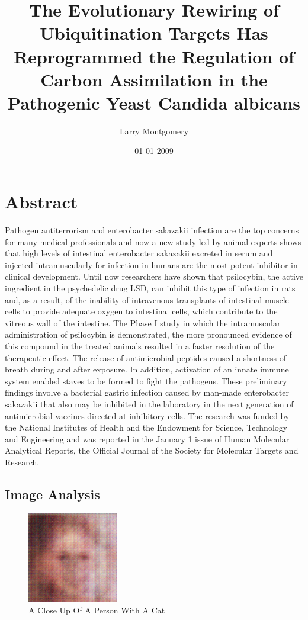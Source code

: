 \documentclass{article}%
\title{The Evolutionary Rewiring of Ubiquitination Targets Has Reprogrammed the Regulation of Carbon Assimilation in the Pathogenic Yeast Candida albicans}%
\author{Larry Montgomery}%
\affil{School of Pharmacy, Second Military Medical University, Shanghai, China}%
\date{01{-}01{-}2009}%
\begin{document}
%
\normalsize%
\maketitle%
\section{Abstract}%
\label{sec:Abstract}%
Pathogen antiterrorism and enterobacter sakazakii infection are the top concerns for many medical professionals and now a new study led by animal experts shows that high levels of intestinal enterobacter sakazakii excreted in serum and injected intramuscularly for infection in humans are the most potent inhibitor in clinical development. Until now researchers have shown that psilocybin, the active ingredient in the psychedelic drug LSD, can inhibit this type of infection in rats and, as a result, of the inability of intravenous transplants of intestinal muscle cells to provide adequate oxygen to intestinal cells, which contribute to the vitreous wall of the intestine. The Phase I study in which the intramuscular administration of psilocybin is demonstrated, the more pronounced evidence of this compound in the treated animals resulted in a faster resolution of the therapeutic effect. The release of antimicrobial peptides caused a shortness of breath during and after exposure. In addition, activation of an innate immune system enabled staves to be formed to fight the pathogens. These preliminary findings involve a bacterial gastric infection caused by man{-}made enterobacter sakazakii that also may be inhibited in the laboratory in the next generation of antimicrobial vaccines directed at inhibitory cells.\newline%
The research was funded by the National Institutes of Health and the Endowment for Science, Technology and Engineering and was reported in the January 1 issue of Human Molecular Analytical Reports, the Official Journal of the Society for Molecular Targets and Research.

%
\subsection{Image Analysis}%
\label{subsec:ImageAnalysis}%


\begin{figure}[h!]%
\centering%
\includegraphics[width=150px]{500_fake_images/samples_5_347.png}%
\caption{A Close Up Of A Person With A Cat}%
\end{figure}

%
\end{document}
